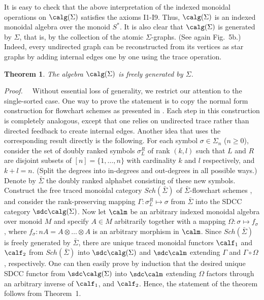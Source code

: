 \documentclass{eptcs}
\newtheorem{theorem}{Theorem}
\begin{document}
It is easy to check that the above interpretation of the indexed monoidal operations on
$\calg (\Sigma )$ satisfies the axioms I1-I9. Thus, $\calg (\Sigma )$ is an indexed
monoidal algebra over the monoid $S^*$. It is also clear that $\calg (\Sigma )$ is
generated by $\Sigma $, that is, by the collection of the atomic $\Sigma $-graphs.
(See again Fig.~5b.) Indeed, every undirected graph can be reconstructed from
its vertices as star graphs by adding internal edges one by one using the
trace operation. 
\begin{theorem}
The algebra $\calg (\Sigma )$ is freely generated by $\Sigma $. 
\end{theorem}
{\em Proof.\ \ }
Without essential loss of generality, we restrict our attention to the
single-sorted case. One way to prove the statement is to copy the normal form construction
for flowchart schemes as presented in \cite{acta}. Each step in this construction
\cite [Theorem 3.3]{mun} is completely analogous, except that one relies on undirected trace 
rather than directed feedback to create internal edges. 
Another idea that uses the corresponding result \cite[Corollary 2]{acta} 
directly
is the following. For each symbol $\sigma \in \Sigma _n$ ($n\geq 0$), consider the set of 
doubly ranked symbols $\sigma ^R_L$ of rank $(k,l)$ such that $L$ and $R$ are disjoint 
subsets of $[n]=\{ 1,\ldots ,n\}$ with cardinality $k$ and $l$ respectively, and
$k+l=n$. (Split the degrees into in-degrees and out-degrees in all possible ways.) Denote by
$\bar {\Sigma }$ the doubly ranked alphabet consisting of these new symbols. Construct
the free traced monoidal category $Sch(\bar {\Sigma })$  of $\bar {\Sigma }$-flowchart schemes
\cite{acta}, and consider the rank-preserving mapping $\Gamma :\sigma ^R_L\mapsto \sigma $ from
$\bar {\Sigma }$ into the SDCC category $\sdc \calg (\Sigma )$. Now let $\calm $ be an
arbitrary indexed monoidal algebra over monoid $M$ and specify $A\in M$ arbitrarily 
together with a mapping $\Omega : \sigma \mapsto f_{\sigma }$, where 
$f_{\sigma }: nA=A\otimes \ldots \otimes A$ is an arbitrary morphism in $\calm $.
Since $Sch(\bar {\Sigma })$ is freely generated by $\bar {\Sigma }$, there are unique
traced monoidal functors $\calf_1$ and $\calf_2$  from $Sch(\bar {\Sigma })$ into 
$\sdc \calg (\Sigma )$ and $\sdc \calm $ extending $\Gamma $ and $\Gamma \circ \Omega $,
respectively. One can then easily prove by induction that the desired unique SDCC functor
from $\sdc \calg (\Sigma )$ into $\sdc \calm $ extending $\Omega $ factors through an
arbitrary inverse of $\calf _1$, and $\calf _2$. Hence, the statement of the theorem
follows from Theorem~1.
\end{document}
